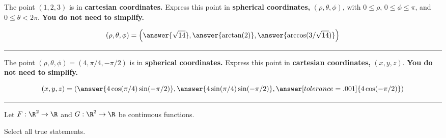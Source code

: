 \documentclass{ximera}
\begin{document}
\begin{problem}
  The point $(1,2,3)$ is in \textbf{cartesian coordinates.} Express
  this point in \textbf{spherical coordinates,} $(\rho,\theta,\phi)$,
  with $0\le \rho$, $0\le \phi \le \pi$, and $0\le \theta<
  2\pi$. \textbf{You do not need to simplify.}
  \begin{prompt}
    \[
    (\rho,\theta,\phi) = \left(\answer{\sqrt{14}},\answer{\arctan(2)},\answer{\arccos(3/\sqrt{14})}\right)
    \]
  \end{prompt}
\end{problem}

\vfill

\hrule

\begin{problem}
  The point $(\rho,\theta,\phi) = (4,\pi/4,-\pi/2)$ is in
  \textbf{spherical coordinates.} Express this point in
  \textbf{cartesian coordinates,} $(x,y,z)$. \textbf{You do not need
    to simplify.}
  \begin{prompt}
    \[
    (x,y,z) = \left(\answer{4\cos(\pi/4)\sin(-\pi/2)},\answer{4\sin(\pi/4)\sin(-\pi/2)},\answer[tolerance=.001]{4\cos(-\pi/2)}\right)
    \]
  \end{prompt}
\end{problem}


\vfill

\hrule

\begin{problem}
  Let $F:\R^2\to\R$ and $G:\R^2\to\R$ be continuous functions.
  \begin{prompt}
    Select all true statements.
  \end{prompt}
  \begin{selectAll}
  \end{selectAll}
\end{problem}
\end{document}
